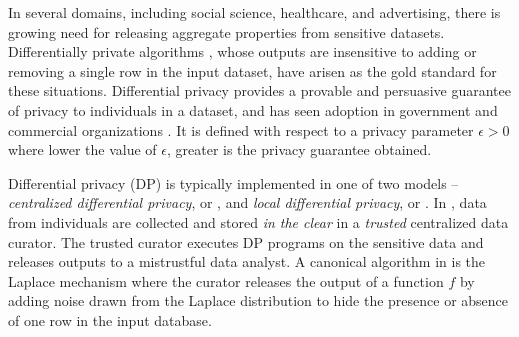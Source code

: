 
In several domains, including social science, healthcare, and advertising, there is growing need for releasing aggregate properties from sensitive datasets. Differentially private algorithms \cite{dwork}, whose outputs are insensitive to adding or removing a single row in the input dataset, have arisen as the gold standard for these situations. Differential privacy provides a provable and persuasive guarantee of privacy to individuals in a dataset, and has seen adoption in government \cite{machanavajjhala08onthemap,Vilhuber17Proceedings} and commercial organizations \cite{Rappor1,Apple}. It is defined with respect to a privacy parameter $\epsilon > 0$ where lower the value of $\epsilon$, greater is the privacy guarantee obtained.

Differential privacy (DP) is typically implemented in one of two models -- \textit{centralized differential privacy}, or \cdp, and \textit{local differential privacy}, or \ldp. In \cdp, data from individuals are collected and stored \textit{in the clear} in a \textit{trusted} centralized data curator. The trusted curator executes DP programs on the sensitive data  and releases outputs to a mistrustful data analyst. A canonical algorithm in \cdp is the Laplace mechanism where the curator releases the output of a function $f$ by adding noise drawn from the Laplace distribution to hide the presence or absence of one row in the input database. 

